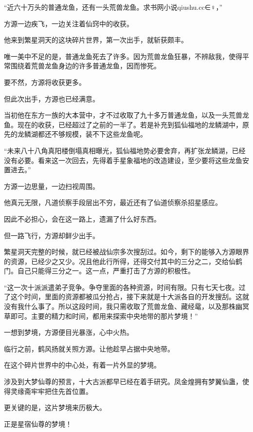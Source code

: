 
\begin{this_body}

“近六十万头的普通龙鱼，还有一头荒兽龙鱼。求书网小说qiushu.cc∈♀，”

方源一边疾飞，一边关注着仙窍中的收获。

他来到繁星洞天的这块碎片世界，第一次出手，就斩获颇丰。

唯一美中不足的是，普通龙鱼死去了许多。因为荒兽龙鱼狂暴，不辨敌我，使得平常围绕着荒兽龙鱼身边的许多普通龙鱼，因而惨死。

要不然，方源将收获更多。

但此次出手，方源也已经满意。

当初他在东方一族的大本营中，才不过收取了九十多万普通龙鱼，以及一头荒兽龙鱼。现在的收获，已经超过了之前的一半了。若是补充到狐仙福地的龙鳞湖中，原先的龙鳞湖都还不够规模，装不下这些龙鱼呢。

“未来八十八角真阳楼倒塌真相曝光，狐仙福地势必要舍弃，再扩张龙鳞湖，已经没有必要。看来这一次回去，先得着手星象福地的改造建设，至少要将这些龙鱼安置进去。”

方源一边思量，一边扫视周围。

他真元无限，凡道侦察手段层出不穷，最近还有了仙道侦察杀招星感应。

因此不必担心，会在这一路上，遗漏了什么好东西。

但一路飞行，方源却鲜少出手。

繁星洞天完整的时候，就已经被战仙宗多次搜刮过。如今，剩下的能够入方源眼界的资源，已经少之又少。况且他此行所得，还得交付其中的三分之二，交给仙鹤门。自己只能得三分之一。这一点，严重打击了方源的积极性。

“这一次十派派遣弟子竞争。争夺里面的各种资源，时间有限。只有七天七夜。过了这个时间，里面的资源都被瓜分抢占，接下来就是十大派各自的开发搜刮。这就没有我什么事了。所以这段时间，我只需收取了荒兽龙鱼、藏经鼋，以及那株幽冥草即可。主要的精力和时间，都用来探索中央地带的那片梦境！”

一想到梦境，方源便目光暴涨，心中火热。

临行之前，鹤风扬就关照方源。让他趁早占据中央地带。

在这个碎片世界中的中心处，有着一片外显的梦境。

涉及到大梦仙尊的预言，十大古派都早已经在着手研究。凤金煌拥有梦翼仙蛊，使得灵缘斋牢牢把住先首位置。

更关键的是，这片梦境来历极大。

正是星宿仙尊的梦境！


\end{this_body}
